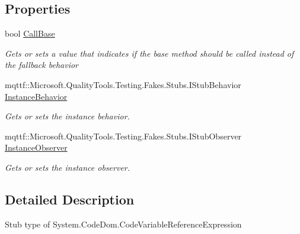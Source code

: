 \subsection*{Properties}
\begin{DoxyCompactItemize}
\item 
bool \hyperlink{class_system_1_1_code_dom_1_1_fakes_1_1_stub_code_variable_reference_expression_a2d7cee4b1179f4f94818ba7c4121f671}{Call\-Base}
\begin{DoxyCompactList}\small\item\em Gets or sets a value that indicates if the base method should be called instead of the fallback behavior\end{DoxyCompactList}\item 
mqttf\-::\-Microsoft.\-Quality\-Tools.\-Testing.\-Fakes.\-Stubs.\-I\-Stub\-Behavior \hyperlink{class_system_1_1_code_dom_1_1_fakes_1_1_stub_code_variable_reference_expression_a2e0704c064a204caa4ae56f7b3376400}{Instance\-Behavior}
\begin{DoxyCompactList}\small\item\em Gets or sets the instance behavior.\end{DoxyCompactList}\item 
mqttf\-::\-Microsoft.\-Quality\-Tools.\-Testing.\-Fakes.\-Stubs.\-I\-Stub\-Observer \hyperlink{class_system_1_1_code_dom_1_1_fakes_1_1_stub_code_variable_reference_expression_a4fdfc6a67bf10d71ba61a3eac29d72f8}{Instance\-Observer}
\begin{DoxyCompactList}\small\item\em Gets or sets the instance observer.\end{DoxyCompactList}\end{DoxyCompactItemize}


\subsection{Detailed Description}
Stub type of System.\-Code\-Dom.\-Code\-Variable\-Reference\-Expression



